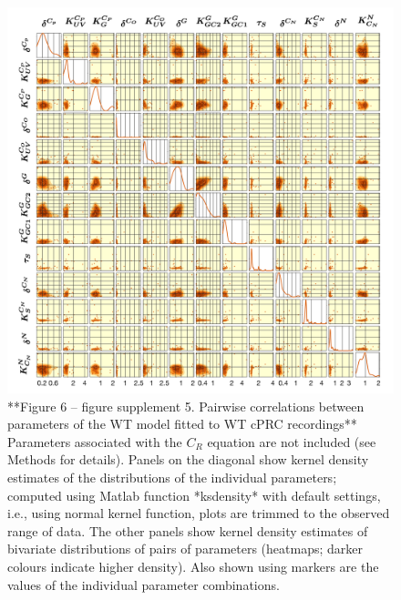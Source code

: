\documentclass[
  10pt,
  onecolumn]{article}
\begin{document}
\begin{figure}
\includegraphics[width=26.25in]{figures/Figure6_fig_Suppl5} \caption{**Figure 6 -- figure supplement 5. Pairwise correlations between parameters of the WT model fitted to WT cPRC recordings** Parameters associated with the $C_R$ equation are not included (see Methods for details). Panels on the diagonal show kernel density estimates of the distributions of the individual parameters; computed using Matlab function *ksdensity* with default settings, i.e., using normal kernel function, plots are trimmed to the observed range of data. The other panels show kernel density estimates of bivariate distributions of pairs of parameters (heatmaps; darker colours indicate higher density). Also shown using markers are the values of the individual parameter combinations.}\label{fig:unnamed-chunk-24}
\end{figure}
\end{document}
